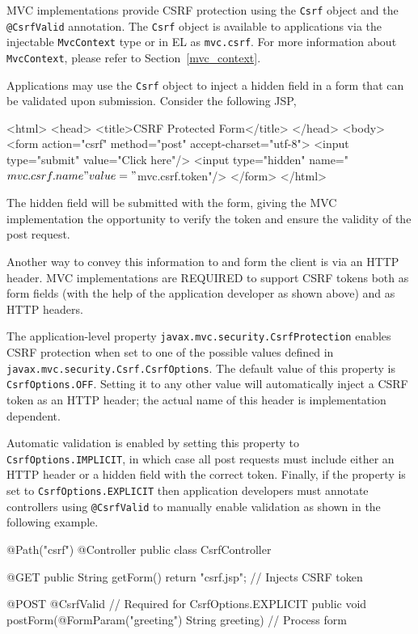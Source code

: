 MVC implementations provide CSRF protection using the {\tt Csrf} object
and the {\tt @CsrfValid} annotation. The {\tt Csrf} object is available to applications
via the injectable {\tt MvcContext} type or in EL as {\tt mvc.csrf}. For more information
about {\tt MvcContext}, please refer to Section~\ref{mvc_context}. 

Applications may use the {\tt Csrf} object to inject a hidden field in a form that can be validated 
upon submission. Consider the following JSP,

\begin{listing}{1}
<html>
<head>
    <title>CSRF Protected Form</title>
</head>
<body>
    <form action="csrf" method="post" accept-charset="utf-8">
        <input type="submit" value="Click here"/>
        <input type="hidden" name="${mvc.csrf.name}" 
                             value="${mvc.csrf.token}"/>
    </form>
</html>
\end{listing}

The hidden field will be submitted with the form, giving the MVC implementation
the opportunity to verify the token and ensure the validity of the post request. 

Another way to convey this information to and form the client is via an HTTP
header. MVC implementations are REQUIRED to support CSRF tokens both
as form fields (with the help of the application developer as shown above) and
as HTTP headers.

The application-level property {\tt javax.mvc.security.CsrfProtection} enables
 CSRF protection when set to one of the possible values defined in
{\tt javax.mvc.security.Csrf.CsrfOptions}. The default value of this property is
{\tt CsrfOptions.OFF}. Setting it to any other value will automatically inject a
CSRF token as an HTTP header; the actual name of this header is 
implementation dependent.

Automatic validation is enabled by setting this
property to {\tt CsrfOptions.IMPLICIT}, in which case all post requests
must include either an HTTP header or a hidden field with the correct token.
Finally, if the property is set to {\tt CsrfOptions.EXPLICIT} then application
developers must annotate controllers using {\tt @CsrfValid} to manually
enable validation  as shown in the following example.

\begin{listing}{1}
@Path("csrf")
@Controller
public class CsrfController {

    @GET
    public String getForm() {
        return "csrf.jsp";     // Injects CSRF token
    }

    @POST
    @CsrfValid		           // Required for CsrfOptions.EXPLICIT
    public void postForm(@FormParam("greeting") String greeting) {
        // Process form
    }
}
 \end{listing}

